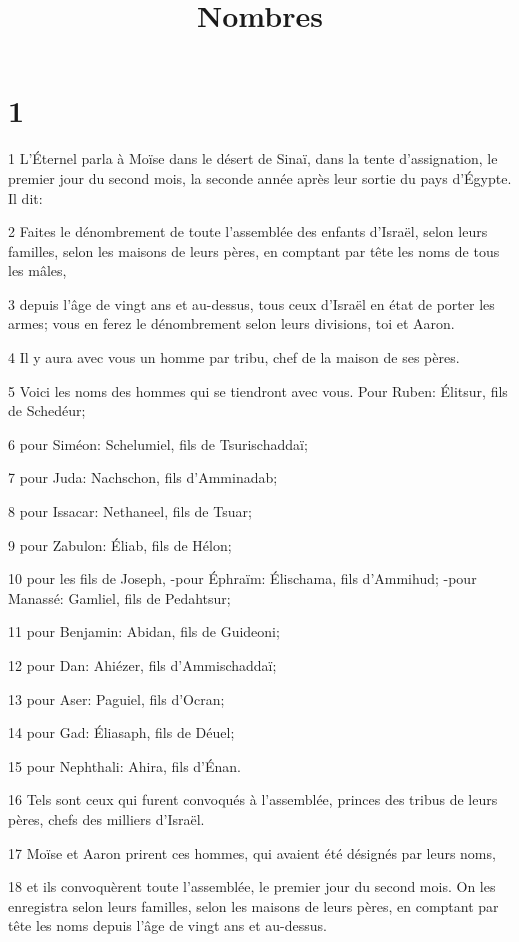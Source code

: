 

\title{Nombres}


\chapter{1}

\par 1 L'Éternel parla à Moïse dans le désert de Sinaï, dans la tente d'assignation, le premier jour du second mois, la seconde année après leur sortie du pays d'Égypte. Il dit:
\par 2 Faites le dénombrement de toute l'assemblée des enfants d'Israël, selon leurs familles, selon les maisons de leurs pères, en comptant par tête les noms de tous les mâles,
\par 3 depuis l'âge de vingt ans et au-dessus, tous ceux d'Israël en état de porter les armes; vous en ferez le dénombrement selon leurs divisions, toi et Aaron.
\par 4 Il y aura avec vous un homme par tribu, chef de la maison de ses pères.
\par 5 Voici les noms des hommes qui se tiendront avec vous. Pour Ruben: Élitsur, fils de Schedéur;
\par 6 pour Siméon: Schelumiel, fils de Tsurischaddaï;
\par 7 pour Juda: Nachschon, fils d'Amminadab;
\par 8 pour Issacar: Nethaneel, fils de Tsuar;
\par 9 pour Zabulon: Éliab, fils de Hélon;
\par 10 pour les fils de Joseph, -pour Éphraïm: Élischama, fils d'Ammihud; -pour Manassé: Gamliel, fils de Pedahtsur;
\par 11 pour Benjamin: Abidan, fils de Guideoni;
\par 12 pour Dan: Ahiézer, fils d'Ammischaddaï;
\par 13 pour Aser: Paguiel, fils d'Ocran;
\par 14 pour Gad: Éliasaph, fils de Déuel;
\par 15 pour Nephthali: Ahira, fils d'Énan.
\par 16 Tels sont ceux qui furent convoqués à l'assemblée, princes des tribus de leurs pères, chefs des milliers d'Israël.
\par 17 Moïse et Aaron prirent ces hommes, qui avaient été désignés par leurs noms,
\par 18 et ils convoquèrent toute l'assemblée, le premier jour du second mois. On les enregistra selon leurs familles, selon les maisons de leurs pères, en comptant par tête les noms depuis l'âge de vingt ans et au-dessus.
